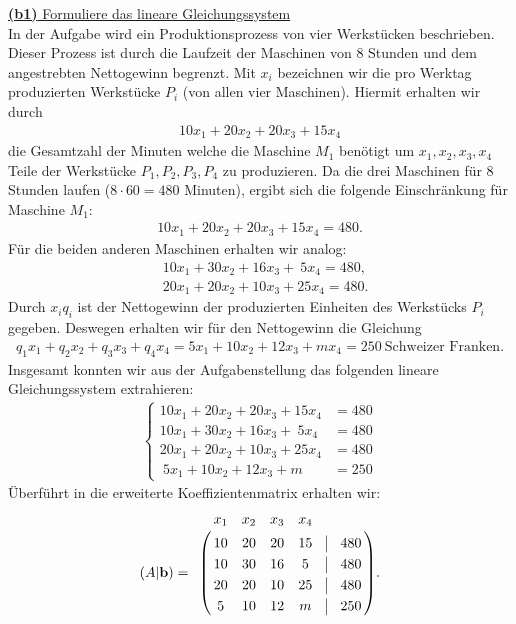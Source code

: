 \underline{\textbf{(b1)} Formuliere das lineare Gleichungssystem}\\
In der Aufgabe wird ein Produktionsprozess von vier Werkstücken beschrieben.
Dieser Prozess ist durch die Laufzeit der Maschinen von $8$ Stunden und dem angestrebten Nettogewinn begrenzt.
Mit $x_i$ bezeichnen wir die pro Werktag produzierten Werkstücke $P_i$ (von allen vier Maschinen). Hiermit erhalten wir durch
\begin{align*}
	10 x_1 + 20 x_2 + 20 x_3 + 15 x_4
\end{align*}
die Gesamtzahl der Minuten welche die Maschine $M_1$ benötigt um $x_1,x_2, x_3, x_4$ Teile der Werkstücke $P_1, P_2 , P_3, P_4$ zu produzieren. Da die drei Maschinen für $8$ Stunden laufen ($8 \cdot 60 = 480$ Minuten), ergibt sich die folgende Einschränkung für Maschine $M_1$:
\begin{align*}
	10 x_1 + 20 x_2 + 20 x_3 + 15 x_4  =480.
\end{align*}
\newpage
Für die beiden anderen Maschinen erhalten wir analog:
\begin{align*}
	&10 x_1 + 30 x_2 + 16 x_3 +  \ 5 x_4  =480,\\
	&20 x_1 + 20 x_2 + 10 x_3 + 25 x_4  =480.
\end{align*}
Durch $x_i q_i$ ist der Nettogewinn der produzierten Einheiten des Werkstücks $P_i$ gegeben. Deswegen erhalten wir für den Nettogewinn die Gleichung
\begin{align*}
	q_1 x_1 + q_2 x_2 + q_3 x_3 + q_4 x_4 = 
	5 x_1 + 10 x_2 + 12 x_3 + m x_4 = 250 \ \text{Schweizer Franken}.
\end{align*}
Insgesamt konnten wir aus der Aufgabenstellung das folgenden lineare Gleichungssystem extrahieren:
\begin{align*}
	\begin{cases}
		10 x_1 + 20 x_2 + 20 x_3 + 15 x_4  &=480 \\
		10 x_1 + 30 x_2 + 16 x_3 +  \ 5 x_4  &=480\\
		20 x_1 + 20 x_2 + 10 x_3 + 25 x_4  &=480\\
		\ 5 x_1 + 10 x_2 + 12 x_3 + m  &= 250
	\end{cases}
\end{align*}
Überführt in die erweiterte Koeffizientenmatrix erhalten wir:
\begin{align*}
(A | \mathbf{b}) =	\bordermatrix{ & x_1 & x_2 & x_3 & x_4 & &  \cr
		& 10 & 20 & 20 &  15 & \BAR & 480 \cr
		& 10 & 30 & 16& 5 &\BAR & 480 \cr
		& 20 & 20 & 10 & 25 &  \BAR & 480  \cr 
		& 5 & 10 & 12 & m & \BAR & 250}.
\end{align*}
